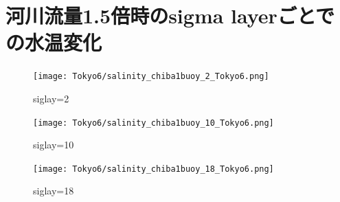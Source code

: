 \documentclass[12pt,a4paper]{jarticle}
\begin{document}
\newpage
\section{河川流量1.5倍時のsigma layerごとでの水温変化}
\begin{figure}[hbtp]
    \centering
        \texttt{[image: Tokyo6/salinity\_chiba1buoy\_2\_Tokyo6.png]}
    \caption{siglay=2}
\end{figure}

\begin{figure}[hbtp]
    \centering
        \texttt{[image: Tokyo6/salinity\_chiba1buoy\_10\_Tokyo6.png]}
    \caption{siglay=10}
\end{figure}

\begin{figure}[hbtp]
    \centering
        \texttt{[image: Tokyo6/salinity\_chiba1buoy\_18\_Tokyo6.png]}
    \caption{siglay=18}
\end{figure}

        
\end{document}
